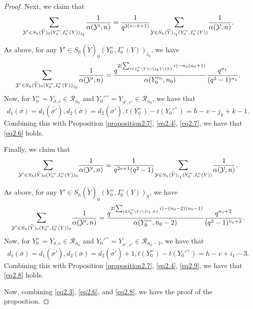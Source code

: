 \documentclass[11pt,oneside]{amsart}
\theoremstyle{plain}
\theoremstyle{definition}
\theoremstyle{remark}
\newcommand{\CR}{{\mathcal R}}
\newcommand{\CY}{{\mathcal Y}}
\numberwithin{equation}{section}
\begin{document}
\begin{proof}
		
		Next, we claim that \begin{equation}\label{eq2.6}\mathlarger{\sum}_{\CY' \in 	S_h(\widetilde{Y})_{0}(Y_0^=,I_0^=(Y))_{j_k}} \dfrac{1}{\alpha(\CY',n)}=\dfrac{1}{q^{2(v-k+1)}}\mathlarger{\sum}_{\CY \in S_h(\widetilde{Y})_{i_{1}}(Y_0^=,I_0^=(Y))} \dfrac{1}{\alpha(\CY,n)}.\end{equation}
		
		As above, for any $Y' \in S_h(\widetilde{Y})_{0}(Y_0^=,I_0^=(Y))_{j_k}$, we have
		\begin{equation}\label{eq2.7}
			\mathlarger{\sum}_{\CY' \in 	S_h(\widetilde{Y})_{0}(Y_0^=,I_0^=(Y))_{j_k}} \dfrac{1}{\alpha(\CY',n)}=\dfrac{q^{2(\sum_{i \in I_0^{=}(Y)\cup\lbrace j_k \rbrace \setminus \lbrace h\rbrace} i)-n_0(n_0+1)}}{\alpha(Y_0'^{=},n_0)}\dfrac{q^{n_1}}{(q^2-1)^{n_1}}.
		\end{equation}
		Now, for $Y_0^==Y_{\overline{\sigma},\overline{e}} \in \CR_{n_0}$ and $Y_0'^==Y_{\overline{\sigma'},\overline{e'}} \in \CR_{n_0}$, we have that
		\begin{equation*}
			d_1(\overline{\sigma})=d_1({\overline{\sigma'}}), d_2({\overline{\sigma}})=d_2({\overline{\sigma'}}), t(Y_0^=)-t(Y_0'^=)=h-v-j_k+k-1.
		\end{equation*}
		Combining this with Proposition \ref{proposition2.7}, \eqref{eq2.4}, \eqref{eq2.7}, we have that \eqref{eq2.6} holds.
		
		Finally, we claim that
		\begin{equation}\label{eq2.8}\mathlarger{\sum}_{\CY' \in 	S_h(\widetilde{Y})_{0}(Y_0^=,I_0^=(Y))_{0}} \dfrac{1}{\alpha(\CY',n)}=\dfrac{1}{q^{2v+1}(q^2-1)}\mathlarger{\sum}_{\CY \in S_h(\widetilde{Y})_{i_{1}}(Y_0^=,I_0^=(Y))} \dfrac{1}{\alpha(\CY,n)}.\end{equation}
		
		As above, for any $Y' \in S_h(\widetilde{Y})_{0}(Y_0^=,I_0^=(Y))_{0}$, we have
		\begin{equation}\label{eq2.9}
			\mathlarger{\sum}_{\CY' \in 	S_h(\widetilde{Y})_{0}(Y_0^=,I_0^=(Y))_{0}} \dfrac{1}{\alpha(\CY',n)}=\dfrac{q^{2(\sum_{i \in I_0^{=}(Y) \setminus \lbrace i_1, h\rbrace} i)-(n_0-2)(n_0-1)}}{\alpha(Y_0'^{=},n_0-2)}\dfrac{q^{n_1+2}}{(q^2-1)^{n_1+2}}.
		\end{equation}
		Now, for $Y_0^==Y_{\overline{\sigma},\overline{e}} \in \CR_{n_0}$ and $Y_0'^==Y_{\overline{\sigma'},\overline{e'}} \in \CR_{n_0-2}$, we have that
		\begin{equation*}
			d_1(\overline{\sigma})=d_1({\overline{\sigma'}}), d_2({\overline{\sigma}})=d_2({\overline{\sigma'}})+1, t(Y_0^=)-t(Y_0'^=)=h-v+i_1-3.
		\end{equation*}
		Combining this with Proposition \ref{proposition2.7}, \eqref{eq2.4}, \eqref{eq2.9}, we have that \eqref{eq2.8} holds.
		
		Now, combining \eqref{eq2.3}, \eqref{eq2.6}, and \eqref{eq2.8}, we have the proof of the proposition.
	\end{proof}
	
\end{document}
